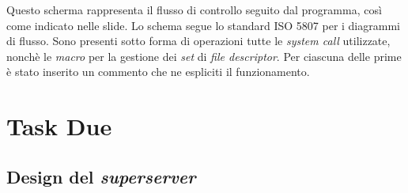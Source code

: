 \documentclass[a4paper, 12pt]{report}
\begin{document}
Questo scherma rappresenta il flusso di controllo seguito dal programma, così come indicato nelle slide. Lo schema segue lo standard ISO 5807 per i diagrammi di flusso. Sono presenti
sotto forma di operazioni tutte le \textit{system call} utilizzate, nonchè le \textit{macro} per la gestione dei \textit{set} di \textit{file descriptor}. Per ciascuna delle prime è stato inserito
un commento che ne espliciti il funzionamento.

\chapter{Task Due}

\section{Design del \textit{superserver}}
\end{document}
